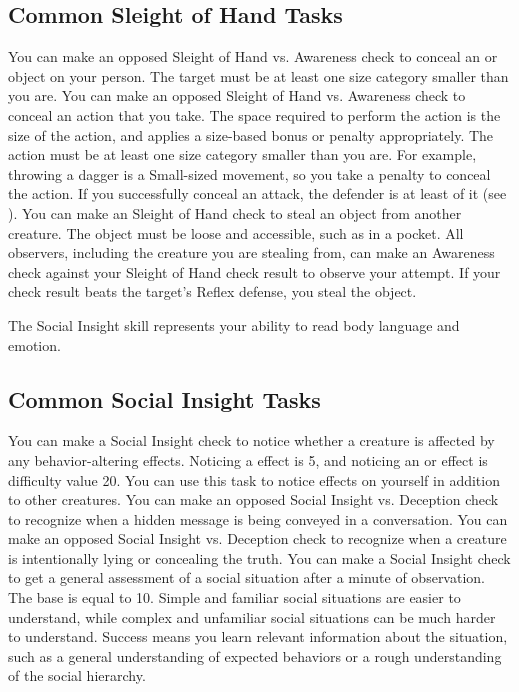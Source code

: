   \subsection{Common Sleight of Hand Tasks}
     You can make an opposed Sleight of Hand vs. Awareness check to conceal an  or  object on your person.
    The target must be at least one size category smaller than you are.
     You can make an opposed Sleight of Hand vs. Awareness check to conceal an action that you take.
    The space required to perform the action is the size of the action, and applies a size-based bonus or penalty appropriately.
    The action must be at least one size category smaller than you are.
    For example, throwing a dagger is a Small-sized movement, so you take a  penalty to conceal the action.
    If you successfully conceal an attack, the defender is at least \partiallyunaware of it (see ).
     You can make an Sleight of Hand check to steal an object from another creature.
    The object must be loose and accessible, such as in a pocket.
    All observers, including the creature you are stealing from, can make an Awareness check against your Sleight of Hand check result to observe your attempt.
    If your check result beats the target's Reflex defense, you steal the object.

\newpage
{}
  The Social Insight skill represents your ability to read body language and emotion.

  \subsection{Common Social Insight Tasks}
     You can make a Social Insight check to notice whether a creature is affected by any behavior-altering effects.
    Noticing a  effect is  5, and noticing an  or  effect is difficulty value 20.
    You can use this task to notice effects on yourself in addition to other creatures.
     You can make an opposed Social Insight vs. Deception check to recognize when a hidden message is being conveyed in a conversation.
     You can make an opposed Social Insight vs. Deception check to recognize when a creature is intentionally lying or concealing the truth.
    You can make a Social Insight check to get a general assessment of a social situation after a minute of observation.
    The base  is equal to 10.
    Simple and familiar social situations are easier to understand, while complex and unfamiliar social situations can be much harder to understand.
    Success means you learn relevant information about the situation, such as a general understanding of expected behaviors or a rough understanding of the social hierarchy.


